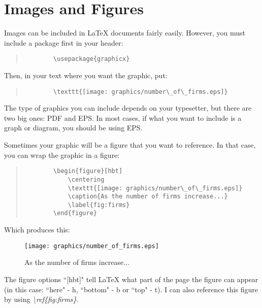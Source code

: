 \section{Images and Figures}

Images can be included in LaTeX documents fairly easily.  However, you must include a package first in your header:

\begin{quote}
	\begin{verbatim}
		\usepackage{graphicx}
	\end{verbatim}
\end{quote}

Then, in your text where you want the graphic, put:
\begin{quote}
	\begin{verbatim}
		\texttt{[image: graphics/number\_of\_firms.eps]}
	\end{verbatim}
\end{quote}

The type of graphics you can include depends on your typesetter, but there are two big ones: PDF and EPS.  In most cases, if what you want to include is a graph or diagram, you should be using EPS.  

Sometimes your graphic will be a figure that you want to reference.  In that case, you can wrap the graphic in a figure:

\begin{quote}
	\begin{verbatim}
		\begin{figure}[hbt]
  			\centering
  			\texttt{[image: graphics/number\_of\_firms.eps]}
  			\caption{As the number of firms increase...}
  			\label{fig:firms}
  		\end{figure}
	\end{verbatim}
\end{quote}

Which produces this:

\begin{figure}[hbt]
	\centering
  	\texttt{[image: graphics/number\_of\_firms.eps]}
  	\caption{As the number of firms increase...}
  	\label{fig:firms}
\end{figure}

The figure options ``[hbt]" tell LaTeX what part of the page the figure can appear (in this case: ``here" - h, ``bottom" - b or ``top" - t).  I can also reference this figure by using \emph{\textbackslash ref\{fig:firms\}}.